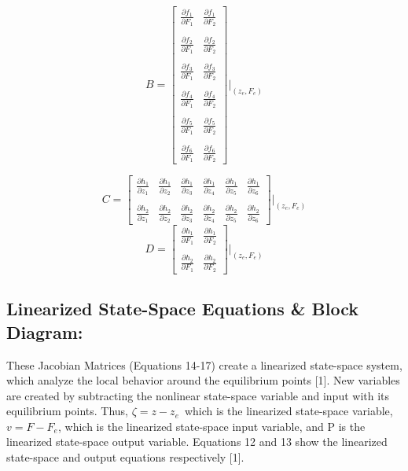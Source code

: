 \documentclass[conference]{IEEEtran}
\begin{document}
\[
B = 
\begin{bmatrix}
\frac{\partial f_1}{\partial F_1}&\frac{\partial f_1}{\partial F_2} \\\\
\frac{\partial f_2}{\partial F_1}&\frac{\partial f_2}{\partial F_2} \\\\
\frac{\partial f_3}{\partial F_1}&\frac{\partial f_3}{\partial F_2} \\\\
\frac{\partial f_4}{\partial F_1}&\frac{\partial f_4}{\partial F_2} \\\\
\frac{\partial f_5}{\partial F_1}&\frac{\partial f_5}{\partial F_2}\\\\
\frac{\partial f_6}{\partial F_1}&\frac{\partial f_6}{\partial F_2}
\end{bmatrix}
\Bigg|_{(z_e,F_e)} 
\tag{9}
\] 

\[
C = 
\begin{bmatrix}
\frac{\partial h_1}{\partial z_1}&\frac{\partial h_1}{\partial z_2}& \frac{\partial h_1}{\partial z_3}& \frac{\partial h_1}{\partial z_4}& \frac{\partial h_1}{\partial z_5} &\frac{\partial h_1}{\partial z_6}\\\\
\frac{\partial h_2}{\partial z_1}&\frac{\partial h_2}{\partial z_2}& \frac{\partial h_2}{\partial z_3}& \frac{\partial h_2}{\partial z_4}& \frac{\partial h_2}{\partial z_5} &\frac{\partial h_2}{\partial z_6}
\end{bmatrix}
\Bigg|_{(z_e,F_e)} 
\tag{10}
\] 
\[
D =
\begin{bmatrix}
\frac{\partial h_1}{\partial F_1}&\frac{\partial h_1}{\partial F_2} \\\\
\frac{\partial h_2}{\partial F_1}&\frac{\partial h_2}{\partial F_2}
\end{bmatrix}
\Bigg|_{(z_e,F_e)} 
\tag{11}
\] 

\newpage
\subsection{Linearized State-Space Equations \& Block Diagram:}
These Jacobian Matrices (Equations 14-17) create a linearized state-space system, which analyze the local behavior around the equilibrium points [1]. New variables are created by subtracting the nonlinear state-space variable and input with its equilibrium points. Thus, $\zeta = z - z_e$\, which is the linearized state-space variable, $v = F - F_e$, which is the linearized state-space input variable, and P is the linearized state-space output variable. Equations 12 and 13 show the linearized state-space and output equations respectively [1].
\end{document}
